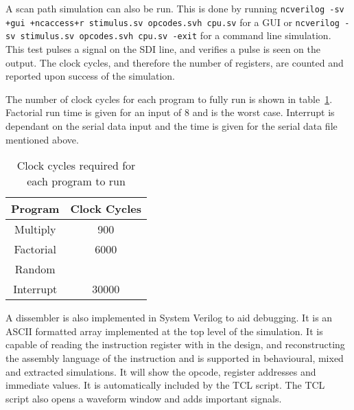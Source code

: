 A scan path simulation can also be run.
This is done by running \texttt{ncverilog -sv +gui +ncaccess+r stimulus.sv  opcodes.svh cpu.sv} for a GUI or \texttt{ncverilog -sv stimulus.sv  opcodes.svh cpu.sv -exit} for a command line simulation.
This test pulses a signal on the SDI line, and verifies a pulse is seen on the output. 
The clock cycles, and therefore the number of registers, are counted and reported upon success of the simulation.

The number of clock cycles for each program to fully run is shown in table~\ref{tab:runtimes}. 
Factorial run time is given for an input of 8 and is the worst case. 
Interrupt is dependant on the serial data input and the time is given for the serial data file mentioned above.

\begin{table}
\centering
\caption{Clock cycles required for each program to run}
\label{tab:runtimes}
\begin{tabular}{|c|c|}
Program & Clock Cycles \\ \hline
Multiply	& 900	\\
Factorial	& 6000	\\
Random		& 	\\
Interrupt	& 30000	\\ \hline
\end{tabular}
\end{table}

A dissembler is also implemented in System Verilog to aid debugging.
It is an ASCII formatted array implemented at the top level of the simulation. 
It is capable of reading the instruction register with in the design, and reconstructing the assembly language of the instruction and is supported in behavioural, mixed and extracted simulations.
It will show the opcode, register addresses and immediate values.
It is automatically included by the TCL script.
The TCL script also opens a waveform window and adds important signals.
